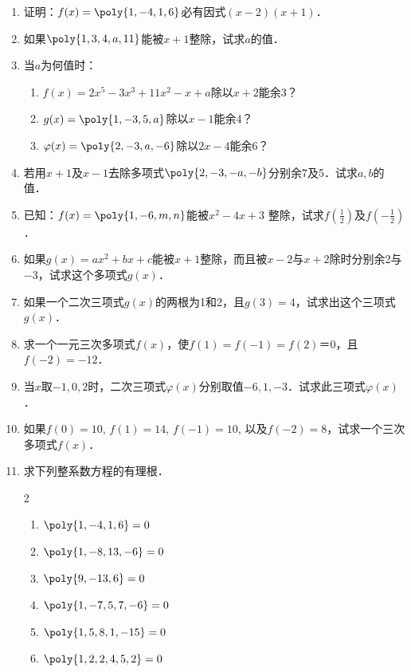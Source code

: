 \begin{enumerate}
\item 证明：$f(x)=\poly{1,-4,1,6}$必有因式$(x-2)(x+1)$．
\item 如果$\poly{1,3,4,a,11}$能被$x+1$整除，试求$a$的值．
\item 当$a$为何值时：
\begin{enumerate}
    \item $f(x)=2x^5-3x^3+11x^2-x+a$除以$x+2$能余3？
    \item $g(x)=\poly{1,-3,5,a}$除以$x-1$能余4？
    \item $\varphi(x)=\poly{2,-3,a,-6}$除以$2x-4$能余6？
\end{enumerate}

\item 若用$x+1$及$x-1$去除多项式$\poly{2,-3,-a,-b}$分别余7及5．试求$a,b$的值．

\item 已知：$f(x)=\poly{1,-6,m,n}$能被$x^2-4x+3$
整除，试求$f\left(\frac{1}{2}\right)$及$f\left(-\frac{1}{2}\right)$．

\item 如果$g(x)=ax^2+bx+c$能被$x+1$整除，而且被$x-2$与$x+2$除时分别余2与$-3$，试求这个多项式$g(x)$．

\item 如果一个二次三项式$g(x)$的两根为1和2，且$g(3)=4$，试求出这个三项式$g(x)$．

\item 求一个一元三次多项式$f(x)$，使$f(1)=f(-1)=f(2)＝0$，且$f(-2)=-12$．
\item 当$x$取$-1, 0, 2$时，二次三项式$\varphi(x)$分别取值$-6,1,-3$．试求此三项式$\varphi(x)$．
\item 如果$f(0)=10$, $f(1)=14$, $f(-1)=10$, 以及$f(-2)=8$，试求一个三次多项式$f(x)$．

\item 求下列整系数方程的有理根．
\begin{multicols}{2}
    \begin{enumerate}
    \item $\poly{1,-4,1,6}=0$
    \item $\poly{1,-8,13,-6}=0$
    \item $\poly{9,-13,6}=0$
    \item $\poly{1,-7,5,7,-6}=0$
    \item $\poly{1,5,8,1,-15}=0$
    \item $\poly{1,2,2,4,5,2}=0$
\end{enumerate}
\end{multicols}


\end{enumerate}
